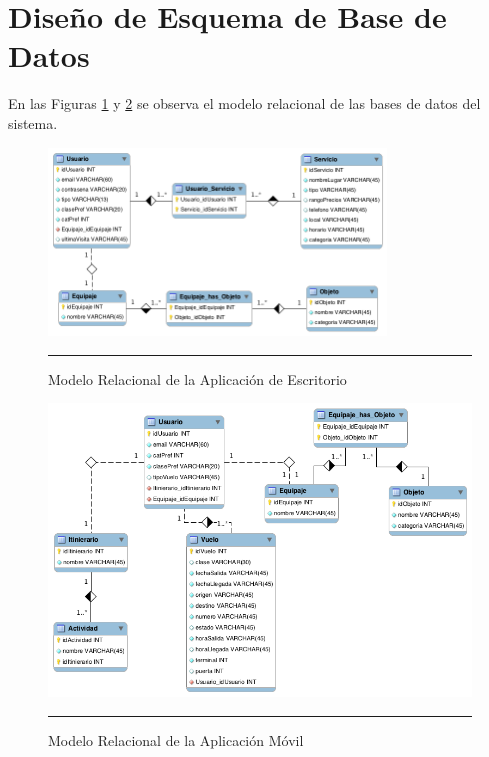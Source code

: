 \newpage
\section{Diseño de Esquema de Base de Datos}

En las Figuras \ref{fig:relacionalAdmin} y \ref{fig:relacionalMovil} se observa el modelo relacional de las bases de datos del sistema.

\begin{figure}[h!]
	\centering
		\includegraphics[width=0.8\textwidth]{Figuras/relacionalAdmin.png}
		\rule{30em}{0.5pt}
	\caption[Modelo Relacional de la Aplicación de Escritorio]{Modelo Relacional de la Aplicación de Escritorio}
	\label{fig:relacionalAdmin}
\end{figure}

\begin{figure}[h!]
	\centering
		\includegraphics[width=1\textwidth]{Figuras/relacionalMovil.png}
		\rule{30em}{0.5pt}
	\caption[Modelo Relacional de la Aplicación Móvil]{Modelo Relacional de la Aplicación Móvil}
	\label{fig:relacionalMovil}
\end{figure}


